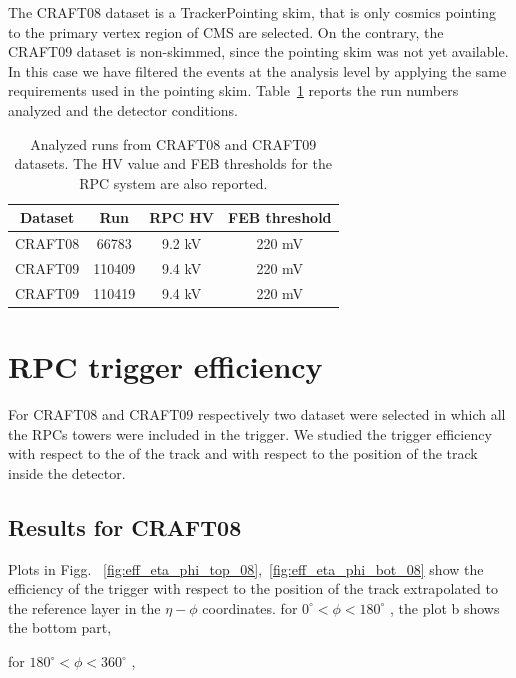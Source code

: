 The CRAFT08 dataset is a TrackerPointing skim, that is 
only cosmics pointing to the primary vertex 
region of CMS are selected. 
On the contrary, the CRAFT09 dataset is non-skimmed, 
since the pointing skim was not yet 
available. In this case we have filtered the 
events at the analysis level by applying the same
requirements used in the pointing skim.
Table~\ref{tab:runs} reports the run numbers analyzed and the detector
conditions.

 \begin{table}[htb]
    \label{tab:runs}
    \begin{center}
      \begin{tabular}{|c|c|c|c|} \hline
Dataset & Run   & RPC HV & FEB threshold \\ \hline
CRAFT08 & 66783 & 9.2 kV & 220 mV \\ \hline
CRAFT09 & 110409  & 9.4 kV & 220 mV \\ \hline
CRAFT09 & 110419  & 9.4 kV & 220 mV \\ \hline
      \end{tabular}
      \caption{Analyzed runs from CRAFT08 
and CRAFT09 datasets. The HV value and FEB thresholds for
the RPC system are also reported.}
    \end{center}
  \end{table}

\section{RPC trigger efficiency}
For CRAFT08 and CRAFT09 respectively two dataset were selected in which all
 the RPCs towers were included in the trigger. We studied the trigger efficiency 
with respect to the \pt of the track and with respect to the position 
of the track inside the detector.

\subsection{Results for CRAFT08}

Plots in Figg. ~\ref{fig:eff_eta_phi_top_08},~\ref{fig:eff_eta_phi_bot_08} show the efficiency of the trigger with respect to the 
position of the track extrapolated to the reference layer in the $\eta - \phi$
coordinates.
for $ 0^\circ < \phi < 180^\circ $ , 
the plot b shows the bottom part,

for  $ 180^\circ < \phi < 360^\circ $ , 


